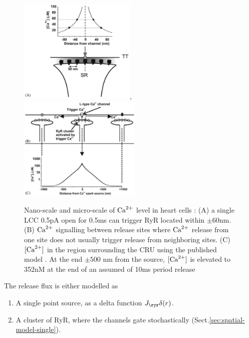 \begin{figure}[hbt]
  \centerline{\includegraphics[height=5cm,
    angle=0]{./images/LCC_Sobie2006.eps},\includegraphics[height=5cm,
    angle=0]{./images/CRU_Sobie2006.eps}}
  \caption{Nano-scale and micro-scale of ${\text{Ca}^{2+}}$ level in heart cells
  \citep{sobie2006}: (A) a single LCC 0.5pA open for 0.5ms can trigger RyR
  located within $\pm 60$nm. (B) ${\text{Ca}^{2+}}$ signalling between release sites where
  ${\text{Ca}^{2+}}$ release from one site does not usually trigger release from neighboring
  sites. (C) $[{\text{Ca}^{2+}}]$ in the region surrounding the CRU using the published
  model \citep{sobie2002tcas}. At the end $\pm 500$ nm from the source, $[{\text{Ca}^{2+}}]$
  is elevated to 352nM at the end of an assumed of 10ms period release}
  \label{fig:CRU_Sobie2006}
\end{figure}


The release flux is either modelled as
\begin{enumerate}
  \item A single point source, as a delta function $J_\ryr\delta(r)$.
  \item A cluster of RyR, where the channels gate stochastically
  (Sect.\ref{sec:spatial-model-single}).
\end{enumerate}
 
